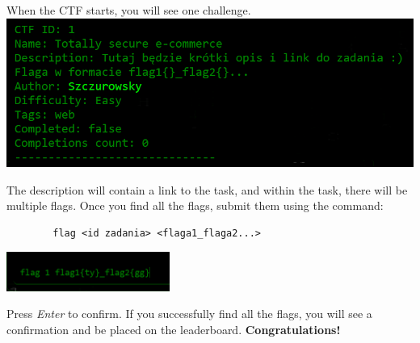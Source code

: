 \documentclass{article}
\begin{document}
When the CTF starts, you will see one challenge.
\vspace{3mm} \\
\includegraphics[width=\textwidth]{"image5.png"}
\vspace{0pt}

The description will contain a link to the task, and within the task, there will be multiple flags. Once you find all the flags, submit them using the command:
\begin{multicols}{2}
    \begin{verbatim}
        flag <id zadania> <flaga1_flaga2...>
    \end{verbatim}
    \columnbreak
    \begin{center}
        \includegraphics[width=0.4\textwidth]{"image6.png"}
    \end{center}
\end{multicols}

Press \textit{Enter} to confirm. If you successfully find all the flags, you will see a confirmation and be placed on the leaderboard. \textbf{Congratulations!}
\end{document}

